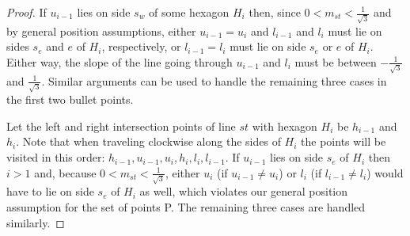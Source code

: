 \begin{proof}
If $u_{i-1}$ lies on side $s_w$ of some hexagon $H_{i}$ then, since
$0 < m_{st} < \frac{1}{\sqrt{3}}$ and by general position assumptions, 
either $u_{i-1}=u_{i}$ and $l_{i-1}$ and $l_{i}$
must lie on sides $s_e$ and $e$ of $H_{i}$, respectively, or $l_{i-1}=l_{i}$ must
lie on side $s_e$ or $e$ of $H_{i}$. Either way, the slope of
the line going through $u_{i-1}$ and $l_{i}$ must be between 
$-\frac{1}{\sqrt{3}}$ and  $\frac{1}{\sqrt{3}}$. Similar arguments can be used
to handle the remaining three cases in the first two bullet points.

Let the left and right intersection points of line $st$ with hexagon $H_{i}$
be  $h_{i-1}$ and $h_{i}$. Note that when traveling clockwise along the sides of
$H_{i}$ the points will be visited in this order: 
$h_{i-1},u_{i-1},u_{i},h_{i}, l_{i}, l_{i-1}$.
If $u_{i-1}$ lies on side $s_e$ of $H_{i}$ then $i>1$ and, because
$0 < m_{st} < \frac{1}{\sqrt{3}}$, either $u_{i}$ (if $u_{i-1} \not= u_{i}$)
or $l_{i}$ (if $l_{i-1} \not= l_{i}$) would have to lie on side $s_e$
of $H_{i}$ as well, which violates our general position assumption for the
set of  points P. The remaining three cases are handled similarly.
\end{proof}





